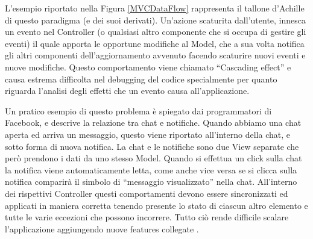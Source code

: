 L'esempio riportato nella Figura \ref{MVCDataFlow} rappresenta il tallone d'Achille di questo paradigma (e dei suoi derivati). Un'azione scaturita dall'utente, innesca un evento nel Controller (o qualsiasi altro componente che si occupa di gestire gli eventi) il quale apporta le opportune modifiche al Model, che a sua volta notifica gli altri componenti dell'aggiornamento avvenuto facendo scaturire nuovi eventi e nuove modifiche. Questo comportamento viene chiamato “Cascading effect” e causa estrema difficolta nel debugging del codice specialmente per quanto riguarda l'analisi degli effetti che un evento causa all'applicazione.

Un pratico esempio di questo problema è spiegato dai programmatori di Facebook, e descrive la relazione tra chat e notifiche. Quando abbiamo una chat aperta ed arriva un messaggio, questo viene riportato all'interno della chat, e sotto forma di nuova notifica. La chat e le notifiche sono due View separate che però prendono i dati da uno stesso Model. Quando si effettua un click sulla chat la notifica viene automaticamente letta, come anche vice versa se si clicca sulla notifica comparirà il simbolo di “messaggio visualizzato” nella chat.
All'interno dei rispettivi Controller questi comportamenti devono essere sincronizzati ed applicati in maniera corretta tenendo presente lo stato di ciascun altro elemento e tutte le varie eccezioni che possono incorrere. Tutto ciò rende difficile scalare l'applicazione aggiungendo nuove features collegate \cite{JingChenOnMVCAndFlux}.
